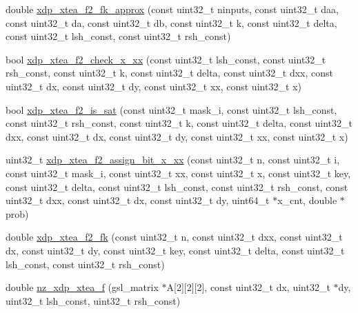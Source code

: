 \begin{DoxyCompactItemize}
\item 
double \hyperlink{xdp-xtea-f-fk_8hh_a69422f7ea09e88db2616953de164360c}{xdp\-\_\-xtea\-\_\-f2\-\_\-fk\-\_\-approx} (const uint32\-\_\-t ninputs, const uint32\-\_\-t daa, const uint32\-\_\-t da, const uint32\-\_\-t db, const uint32\-\_\-t k, const uint32\-\_\-t delta, const uint32\-\_\-t lsh\-\_\-const, const uint32\-\_\-t rsh\-\_\-const)
\item 
bool \hyperlink{xdp-xtea-f-fk_8hh_a64e29f4229587aa126d72879aeddb7f3}{xdp\-\_\-xtea\-\_\-f2\-\_\-check\-\_\-x\-\_\-xx} (const uint32\-\_\-t lsh\-\_\-const, const uint32\-\_\-t rsh\-\_\-const, const uint32\-\_\-t k, const uint32\-\_\-t delta, const uint32\-\_\-t dxx, const uint32\-\_\-t dx, const uint32\-\_\-t dy, const uint32\-\_\-t xx, const uint32\-\_\-t x)
\item 
bool \hyperlink{xdp-xtea-f-fk_8hh_ad18e7e8325085dc5af45386f525ef8dc}{xdp\-\_\-xtea\-\_\-f2\-\_\-is\-\_\-sat} (const uint32\-\_\-t mask\-\_\-i, const uint32\-\_\-t lsh\-\_\-const, const uint32\-\_\-t rsh\-\_\-const, const uint32\-\_\-t k, const uint32\-\_\-t delta, const uint32\-\_\-t dxx, const uint32\-\_\-t dx, const uint32\-\_\-t dy, const uint32\-\_\-t xx, const uint32\-\_\-t x)
\item 
uint32\-\_\-t \hyperlink{xdp-xtea-f-fk_8hh_ae8fb7edb5c3d4ee3057e135328e2f91f}{xdp\-\_\-xtea\-\_\-f2\-\_\-assign\-\_\-bit\-\_\-x\-\_\-xx} (const uint32\-\_\-t n, const uint32\-\_\-t i, const uint32\-\_\-t mask\-\_\-i, const uint32\-\_\-t xx, const uint32\-\_\-t x, const uint32\-\_\-t key, const uint32\-\_\-t delta, const uint32\-\_\-t lsh\-\_\-const, const uint32\-\_\-t rsh\-\_\-const, const uint32\-\_\-t dxx, const uint32\-\_\-t dx, const uint32\-\_\-t dy, uint64\-\_\-t $\ast$x\-\_\-cnt, double $\ast$prob)
\item 
double \hyperlink{xdp-xtea-f-fk_8hh_a07745fc94a36ed4c7d2f803f031456b0}{xdp\-\_\-xtea\-\_\-f2\-\_\-fk} (const uint32\-\_\-t n, const uint32\-\_\-t dxx, const uint32\-\_\-t dx, const uint32\-\_\-t dy, const uint32\-\_\-t key, const uint32\-\_\-t delta, const uint32\-\_\-t lsh\-\_\-const, const uint32\-\_\-t rsh\-\_\-const)
\item 
double \hyperlink{xdp-xtea-f-fk_8hh_abaad14648bcd64a8cfd25e444e73d27a}{nz\-\_\-xdp\-\_\-xtea\-\_\-f} (gsl\-\_\-matrix $\ast$\-A\mbox{[}2\mbox{]}\mbox{[}2\mbox{]}\mbox{[}2\mbox{]}, const uint32\-\_\-t dx, uint32\-\_\-t $\ast$dy, uint32\-\_\-t lsh\-\_\-const, uint32\-\_\-t rsh\-\_\-const)
\end{DoxyCompactItemize}


